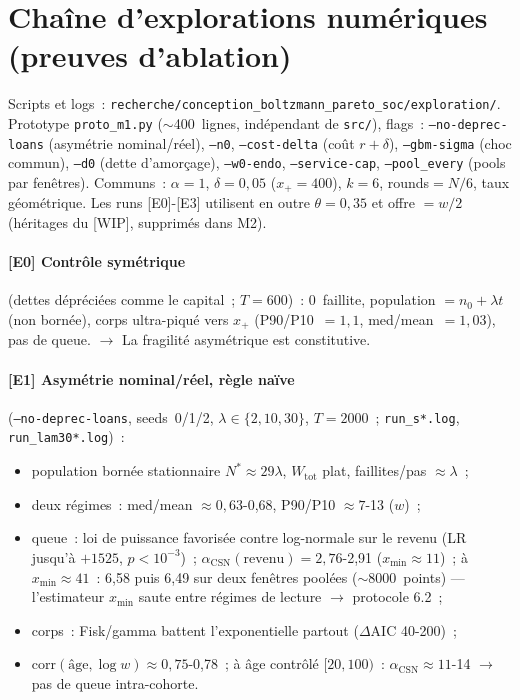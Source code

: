 \documentclass[11pt,a4paper]{article}
\begin{document}
\appendix
\renewcommand{\thesection}{\Alph{section}}

\section{Chaîne d'explorations numériques (preuves d'ablation)}
\label{sec:annexe-a}

Scripts et logs~: \texttt{recherche/conception_boltzmann_pareto_soc/exploration/}. Prototype \texttt{proto_m1.py} ($\sim$400~lignes, indépendant de \texttt{src/}), flags~: \texttt{--no-deprec-loans} (asymétrie nominal/réel), \texttt{--n0}, \texttt{--cost-delta} (coût $r+\delta$), \texttt{--gbm-sigma} (choc commun), \texttt{--d0} (dette d'amorçage), \texttt{--w0-endo}, \texttt{--service-cap}, \texttt{--pool_every} (pools par fenêtres). Communs~: $\alpha=1$, $\delta=0{,}05$ ($x_+=400$), $k=6$, rounds$=N/6$, taux géométrique. Les runs [E0]-[E3] utilisent en outre $\theta=0{,}35$ et offre $=w/2$ (héritages du [WIP], supprimés dans M2).

\paragraph{[E0] Contrôle symétrique} (dettes dépréciées comme le capital~; $T=600$)~: 0~faillite, population $=n_0+\lambda t$ (non bornée), corps ultra-piqué vers $x_+$ (P90/P10~$=1{,}1$, med/mean~$=1{,}03$), pas de queue. $\to$ La fragilité asymétrique est constitutive.

\paragraph{[E1] Asymétrie nominal/réel, règle naïve} (\texttt{--no-deprec-loans}, seeds~0/1/2, $\lambda\in\{2,10,30\}$, $T=2000$~; \texttt{run_s*.log}, \texttt{run_lam30*.log})~:
\begin{itemize}
  \item population bornée stationnaire $N^*\approx 29\lambda$, $W_{\mathrm{tot}}$ plat, faillites/pas $\approx\lambda$~;
  \item deux régimes~: med/mean $\approx 0{,}63$-0,68, P90/P10 $\approx 7$-13 ($w$)~;
  \item queue~: loi de puissance favorisée contre log-normale sur le revenu (LR jusqu'à $+1525$, $p<10^{-3}$)~; $\alpha_{\mathrm{CSN}}(\text{revenu})=2{,}76$-2,91 ($x_{\min}\approx 11$)~; à $x_{\min}\approx 41$~: 6,58 puis 6,49 sur deux fenêtres poolées ($\sim$8000~points) --- l'estimateur $x_{\min}$ saute entre régimes de lecture $\to$ protocole 6.2~;
  \item corps~: Fisk/gamma battent l'exponentielle partout ($\Delta\mathrm{AIC}$ 40-200)~;
  \item $\mathrm{corr}(\text{âge},\log w)\approx 0{,}75$-0,78~; à âge contrôlé $[20,100)$~: $\alpha_{\mathrm{CSN}}\approx 11$-14 $\to$ pas de queue intra-cohorte.
\end{itemize}
\end{document}
